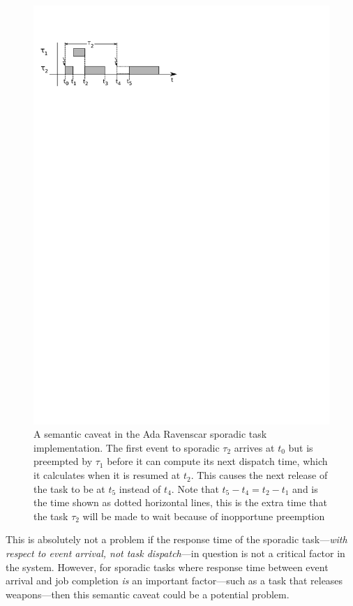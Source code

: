 \begin{figure}
\centering
\includegraphics{figs/sporadic_caveat}
\caption{A semantic caveat in the Ada Ravenscar sporadic task
  implementation. The first event to sporadic $\tau_2$ arrives at
  $t_0$ but is preempted by $\tau_1$ before it can compute its next
  dispatch time, which it calculates when it is resumed at $t_2$. This
  causes the next release of the task to be at $t_5$ instead of
  $t_4$. Note that $t_5 - t_4 = t_2 - t_1$ and is the time shown as
  dotted horizontal lines, this is the extra time that the task
  $\tau_2$ will be made to wait because of inopportune preemption}
\label{fig:caveat}
\end{figure}

This is absolutely not a problem if the response time of the sporadic
task---\emph{with respect to event arrival, not task dispatch}---in
question is not a critical factor in the system. However, for sporadic
tasks where response time between event arrival and job completion
\emph{is} an important factor---such as a task that releases
weapons---then this semantic caveat could be a potential problem.

